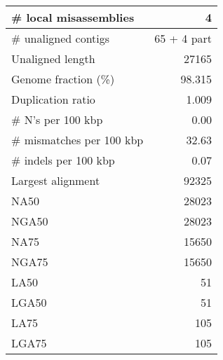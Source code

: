 \documentclass[12pt,a4paper]{article}
\begin{document}
\begin{table}[ht]
\begin{center}
\begin{tabular}{|l*{1}{|r}|}
\# local misassemblies & 4 \\ \hline
\# unaligned contigs & 65 + 4 part \\ \hline
Unaligned length & 27165 \\ \hline
Genome fraction (\%) & 98.315 \\ \hline
Duplication ratio & 1.009 \\ \hline
\# N's per 100 kbp & 0.00 \\ \hline
\# mismatches per 100 kbp & 32.63 \\ \hline
\# indels per 100 kbp & 0.07 \\ \hline
Largest alignment & 92325 \\ \hline
NA50 & 28023 \\ \hline
NGA50 & 28023 \\ \hline
NA75 & 15650 \\ \hline
NGA75 & 15650 \\ \hline
LA50 & 51 \\ \hline
LGA50 & 51 \\ \hline
LA75 & 105 \\ \hline
LGA75 & 105 \\ \hline
\end{tabular}
\end{center}
\end{table}
\end{document}
